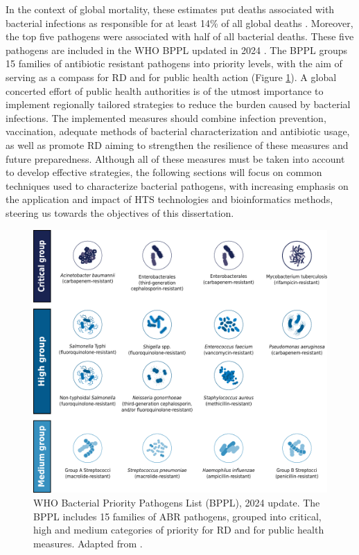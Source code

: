 In the context of global mortality, these estimates put deaths associated with bacterial infections as responsible for at least 14\% of all global deaths \cite{ikuta_global_2022}. Moreover, the top five pathogens were associated with half of all bacterial deaths. These five pathogens are included in the \ac{WHO} \ac{BPPL} updated in 2024 \cite{who_bppl_2024}. The \ac{BPPL} groups 15 families of antibiotic resistant pathogens into priority levels, with the aim of serving as a compass for \ac{RD} and for public health action (Figure \ref{fig:introduction_figure2}). A global concerted effort of public health authorities is of the utmost importance to implement regionally tailored strategies to reduce the burden caused by bacterial infections. The implemented measures should combine infection prevention, vaccination, adequate methods of bacterial characterization and antibiotic usage, as well as promote \ac{RD} aiming to strengthen the resilience of these measures and future preparedness. Although all of these measures must be taken into account to develop effective strategies, the following sections will focus on common techniques used to characterize bacterial pathogens, with increasing emphasis on the application and impact of \ac{HTS} technologies and bioinformatics methods, steering us towards the objectives of this dissertation.

\begin{figure}[!ht]
    \centering
    \includegraphics[angle=0,width=\textwidth]{figures/introduction/Figure2.pdf}
    \caption[\ac{WHO} Bacterial Priority Pathogens List, 2024 update]{WHO Bacterial Priority Pathogens List (BPPL), 2024 update. The \ac{BPPL} includes 15 families of \ac{ABR} pathogens, grouped into critical, high and medium categories of priority for \ac{RD} and for public health measures. Adapted from \cite{who_bppl_2024}.}
    \label{fig:introduction_figure2}
\end{figure}

